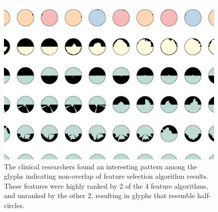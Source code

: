 \begin{figure}[ht]
\centering
\includegraphics[width=\linewidth]{infuse/usecase1b}
\caption{
The clinical researchers found an interesting pattern among
the glyphs indicating non-overlap of feature selection algorithm results.
These features were highly ranked by 2 of the 4 feature algorithms,
and unranked by the other 2, resulting in glyphs that resemble half-circles.
}
\label{fig:usecase1}
\end{figure}
